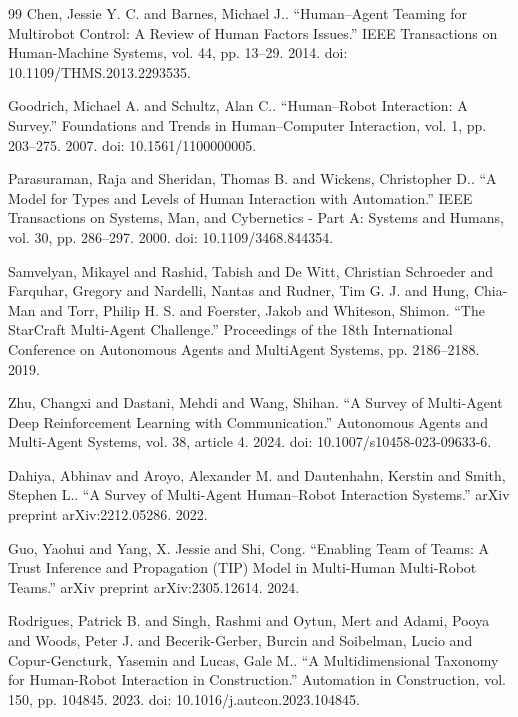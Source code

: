 \documentclass[preprint,12pt]{elsarticle}
\begin{document}
\begin{thebibliography}{99}
 Chen, Jessie Y. C. and Barnes, Michael J.. ``Human--Agent Teaming for Multirobot Control: A Review of Human Factors Issues.'' IEEE Transactions on Human-Machine Systems, vol. 44, pp. 13--29. 2014. doi: 10.1109/THMS.2013.2293535.

 Goodrich, Michael A. and Schultz, Alan C.. ``Human--Robot Interaction: A Survey.'' Foundations and Trends in Human--Computer Interaction, vol. 1, pp. 203--275. 2007. doi: 10.1561/1100000005.

 Parasuraman, Raja and Sheridan, Thomas B. and Wickens, Christopher D.. ``A Model for Types and Levels of Human Interaction with Automation.'' IEEE Transactions on Systems, Man, and Cybernetics - Part A: Systems and Humans, vol. 30, pp. 286--297. 2000. doi: 10.1109/3468.844354.

 Samvelyan, Mikayel and Rashid, Tabish and De Witt, Christian Schroeder and Farquhar, Gregory and Nardelli, Nantas and Rudner, Tim G. J. and Hung, Chia-Man and Torr, Philip H. S. and Foerster, Jakob and Whiteson, Shimon. ``The StarCraft Multi-Agent Challenge.'' Proceedings of the 18th International Conference on Autonomous Agents and MultiAgent Systems, pp. 2186--2188. 2019.


 Zhu, Changxi and Dastani, Mehdi and Wang, Shihan. ``A Survey of Multi-Agent Deep Reinforcement Learning with Communication.'' Autonomous Agents and Multi-Agent Systems, vol. 38, article 4. 2024. doi: 10.1007/s10458-023-09633-6.

 Dahiya, Abhinav and Aroyo, Alexander M. and Dautenhahn, Kerstin and Smith, Stephen L.. ``A Survey of Multi-Agent Human--Robot Interaction Systems.'' arXiv preprint arXiv:2212.05286. 2022.

 Guo, Yaohui and Yang, X. Jessie and Shi, Cong. ``Enabling Team of Teams: A Trust Inference and Propagation (TIP) Model in Multi-Human Multi-Robot Teams.'' arXiv preprint arXiv:2305.12614. 2024.

 Rodrigues, Patrick B. and Singh, Rashmi and Oytun, Mert and Adami, Pooya and Woods, Peter J. and Becerik-Gerber, Burcin and Soibelman, Lucio and Copur-Gencturk, Yasemin and Lucas, Gale M.. ``A Multidimensional Taxonomy for Human-Robot Interaction in Construction.'' Automation in Construction, vol. 150, pp. 104845. 2023. doi: 10.1016/j.autcon.2023.104845.


\end{thebibliography}
\end{document}
